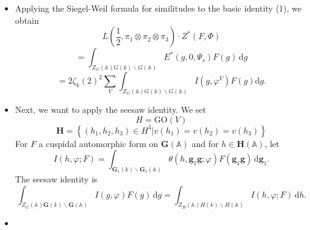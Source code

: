 \documentclass[12pt]{article}
\begin{document}
\begin{itemize}
    
\item Applying the Siegel-Weil formula for similitudes to the basic identity
(1), we obtain 
%
\[L\left(\frac{1}{2}, \pi_1 \otimes \pi_2 \otimes \pi_3\right) \cdot
Z^{*}\left(F, \Phi\right)\]
%
\[= \int_{Z_{G}\left(\mathbb{A}\right)G\left(k\right) \backslash
G\left(\mathbb{A}\right)}^{} E^{*}\left(g, 0, \Psi_{s}\right) F\left(g\right) \,
\mathrm{d}g\] 
%
\[= 2 \zeta_{k}\left(2\right)^{2} \sum_{V}^{}
\int_{Z_{G}\left(\mathbb{A}\right)G\left(k\right) \backslash
G\left(\mathbb{A}\right)} I\left(g, \varphi^{V}\right) F\left(g\right)
\mathrm{d}g.\]

\item Next, we want to apply the seesaw identity. We set 
%
\[H = \text{GO}\left(V\right)\]
%
%
\[\textbf{H} = \left\{\left(h_1, h_2, h_3\right) \in H^{3} | v\left(h_{1}\right)
= v\left(h_2\right) = v\left(h_3\right)\right\}\]
%
For $F$ a cuspidal automorphic form on $\textbf{G}\left(\mathbb{A}\right)$ and
for $h \in \textbf{H}\left(\mathbb{A}\right)$, let 
%
\[I\left(h, \varphi; F\right) = \int_{\textbf{G}_{1}\left(k\right) \backslash
\textbf{G}_1\left(\mathbb{A}\right)}^{} \theta\left(h, \textbf{g}_1\textbf{g};
\varphi\right) F\left(\textbf{g}_{1} \textbf{g}\right) \,
\mathrm{d}\textbf{g}_{1}.\]
%
The seesaw identity is
%
\[\int_{Z_{G}\left(\mathbb{A}\right) \textbf{G}\left(k\right) \backslash
\textbf{G}\left(\mathbb{A}\right)}^{} I\left(g, \varphi\right) F\left(g\right)
\, \mathrm{d}g = \int_{Z_{H}\left(\mathbb{A}\right)H\left(k\right) \backslash
H\left(\mathbb{A}\right)}^{} I\left(h, \varphi ; F \right) \, \mathrm{d}h.\]
%
\item 
\end{itemize}
\end{document}

